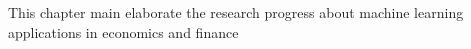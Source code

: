 This chapter main elaborate the research progress about machine learning applications in economics and finance